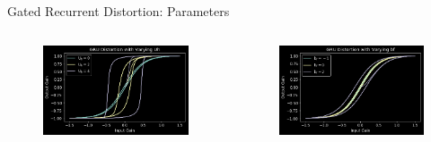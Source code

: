 \begin{frame}{Gated Recurrent Distortion: Parameters}
    \begin{columns}
        \begin{column}{0.5\linewidth}
            \begin{figure}
                \centering
                \includegraphics[width=2.75in]{../GatedRecurrentDistortion/Pics/uh}
            \end{figure}
        \end{column}
        \begin{column}{0.5\linewidth}
            \begin{figure}
                \centering
                \includegraphics[width=2.75in]{../GatedRecurrentDistortion/Pics/bf}
            \end{figure}
        \end{column}
    \end{columns}
\end{frame}


